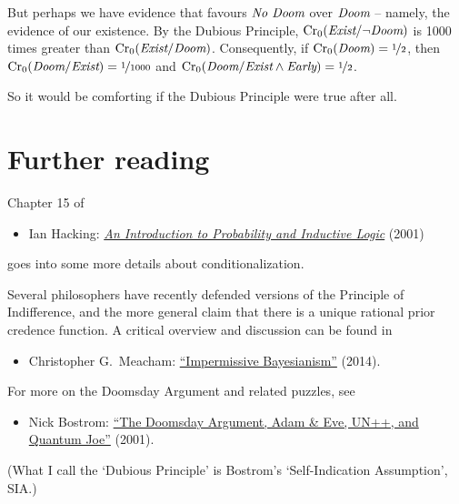 But perhaps we have evidence that favours $\emph{No Doom}$
over $\emph{Doom}$ -- namely, the evidence of our existence. By the
Dubious Principle, $\text{Cr}_0(\emph{Exist}/\neg\emph{Doom})$ is 1000
times greater than $\text{Cr}_0(\emph{Exist}/\emph{Doom})$. Consequently,
if $\text{Cr}_0(\emph{Doom}) = \nicefrac{1}{2}$, then
$\text{Cr}_0(\emph{Doom}/\emph{Exist}) = \nicefrac{1}{1000}$ and
$\text{Cr}_0(\emph{Doom}/\emph{Exist} \land \emph{Early}) = \nicefrac{1}{2}$.

So it would be comforting if the Dubious Principle were true after all.



\section{Further reading}

Chapter 15 of 
\begin{itemize}
\item Ian Hacking: \href{http://fitelson.org/confirmation/hacking_introduction_to_probability_and_inductive_logic.pdf}{\emph{An Introduction to Probability and Inductive Logic}} (2001)
\end{itemize}
goes into some more details about conditionalization. 

Several philosophers have recently defended versions of the Principle
of Indifference, and the more general claim that there is a unique
rational prior credence function. A critical overview and discussion
can be found in
\begin{itemize}
\item Christopher G.\ Meacham: \href{http://people.umass.edu/cmeacham/Meacham.Impermissive.Bayesiansim.pdf}{``Impermissive Bayesianism''} (2014).
\end{itemize}


For more on the Doomsday Argument and related puzzles, see
\begin{itemize}
\item Nick Bostrom:
  \href{http://www.anthropic-principle.com/preprints/cau/paradoxes.html}{``The
    Doomsday Argument, Adam \& Eve, UN++, and Quantum Joe''} (2001).
\end{itemize}
(What I call the `Dubious Principle' is Bostrom's `Self-Indication Assumption', SIA.)

